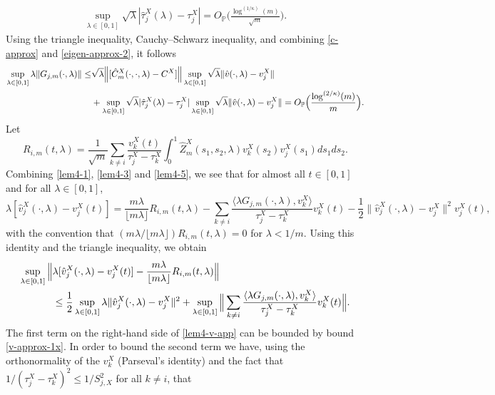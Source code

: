 \documentclass[11pt]{article}
\numberwithin{equation}{section}
\numberwithin{theorem}{section}
\numberwithin{lemma}{section}
\numberwithin{proposition}{section}
\numberwithin{cor}{section}
\numberwithin{definition}{section}
\numberwithin{cons}{section}
\numberwithin{rem}{section}
\numberwithin{exa}{section}
\numberwithin{table}{section}
\numberwithin{figure}{section}
\numberwithin{algo}{section}
\begin{document}
{{\begin{align}
\sup_{\lambda \in [0,1]} \sqrt{\lambda}|\hat{\tau}^X_j(\lambda) - \tau^X_j| = O_\mathbb{P}\Big(\frac{\log^{(1/\kappa)}(m)}{\sqrt{m}}\Big).
\end{align}
Using the triangle inequality, Cauchy--Schwarz inequality, and combining \eqref{c-approx} and \eqref{eigen-approx-2}, it follows
\begin{align}\label{G-approx}
\sup_{\lambda \in [0,1]} \lambda\|G_{j,m}(\cdot,\lambda)\| \le&  \sqrt{\lambda}\Big\|[\hat{C}_m^X(\cdot,\cdot,\lambda)- C^X] \Big\|\sup_{\lambda \in [0,1]} \sqrt{\lambda}\| \hat{v}(\cdot,\lambda) - v^X_j\| \\
&+\sup_{\lambda \in [0,1]} \sqrt{\lambda}|\hat{\tau}^X_j(\lambda) - \tau^X_j| \sup_{\lambda \in [0,1]}\sqrt{\lambda} \| \hat{v}(\cdot,\lambda) - v^X_j\|
=O_\mathbb{P}\Big(\frac{\log^{(2/\kappa)}(m)}{m} \Big). \notag
\end{align}
Let
$$
R_{i,m}(t, \lambda) = \frac {1}{\sqrt{m}} \sum_{k \neq i} \frac {v^X_k(t)}{\tau^X_j - \tau^X_k} \int^1_0 \hat Z^X_m (s_1, s_2, \lambda) v^X_k (s_2) v^X_j(s_1) ds_1  ds_2 .
$$
Combining \eqref{lem4-1}, \eqref{lem4-3} and \eqref{lem4-5}, we see that for almost all $t\in [0,1]$ and for all $\lambda \in [0,1]$,
$$
\lambda[\hat{v}^X_j(\cdot,\lambda) - v^X_j(t)]  = \frac{m\lambda}{\lfloor m \lambda \rfloor} R_{i,m}(t,\lambda) - \sum_{k \neq i} \frac{\langle \lambda G_{j,m}(\cdot,\lambda),v^X_k \rangle}{\tau^X_j - \tau^X_k}  v^X_k(t) -\frac{1}{2} \| \hat{v}^X_j(\cdot,\lambda) - v^X_j\|^2v_j^X(t),
$$
with the convention that $({m\lambda}/{\lfloor m \lambda \rfloor}) R_{i,m}(t,\lambda)=0$ for $\lambda < 1/m$.  Using this identity and the triangle inequality, we obtain
\begin{align}\label{lem4-v-app}
\sup_{\lambda \in [0,1]} \Big\| &  \lambda[\hat{v}^X_j(\cdot,\lambda) - v^X_j(t)] - \frac{m\lambda}{\lfloor m \lambda \rfloor} R_{i,m}(t,\lambda)\Big\| \\
&\le  \frac{1}{2} \sup_{\lambda \in [0,1]} \lambda\| \hat{v}^X_j(\cdot,\lambda) - v^X_j\|^2 + \sup_{\lambda \in [0,1]} \Big\|\sum_{k \neq i} \frac{\langle \lambda G_{j,m}(\cdot,\lambda),v^X_k \rangle}{\tau^X_j - \tau^X_k}  v^X_k(t)\Big\|.   \notag
\end{align}
The first term on the right-hand side of \eqref{lem4-v-app}  can be bounded by  bound \eqref{v-approx-1x}. In order to bound the second term we have, using the orthonormality of the $v^X_k$ (Parseval's identity) and the fact that  $1/(\tau^X_j - \tau^X_k)^2 \le 1/S_{j,X}^2$ for all $k\ne i$, that
\begin{align*}

\end{align*}}}
\end{document}
